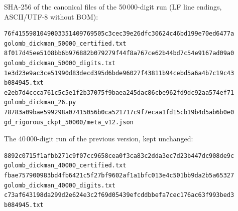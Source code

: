 \documentclass[11pt,a4paper]{article}
\theoremstyle{remark}
\begin{document}
SHA-256 of the canonical files of the 50\,000-digit run (LF line
endings, ASCII/UTF-8 without BOM):
\begin{lstlisting}
76f4155981049003351409769505c3cec39e26dfc30624c46bd199e70ed6477a  golomb_dickman_50000_certified.txt
8f017d45ee5108bb6b976882b079279f44f8a767ce62b44bd7c54e9167ad09a0  golomb_dickman_50000_digits.txt
1e3d23e9ac3ce51990d83decd395d6bde96027f43811b94cebd5a6a4b7c19c43  b084945.txt
e2eb7d4ccca761c5c5e1f2b37075f9baea245dac86cbe962fd9dc92aa574ef71  golomb_dickman_26.py
78783a09bae599298a07415056b0ca521717c9f7ecaa1fd15cb19b4d5ab6b0e0  gd_rigorous_ckpt_50000/meta_v12.json
\end{lstlisting}
The 40\,000-digit run of the previous version, kept unchanged:
\begin{lstlisting}
8892c0715f1afbb271c9f07cc9658cea0f3ca83c2dda3ec7d23b447dc908de9c  golomb_dickman_40000_certified.txt
fbae757900983bd4fb6421c5f27bf9602af1a1bfc013e4c501bb9da2b5a65327  golomb_dickman_40000_digits.txt
c73af643198da299d2e624e3c2f69d05439efcddbbefa7cec176ac63f993bed3  b084945.txt
\end{lstlisting}
\end{document}
